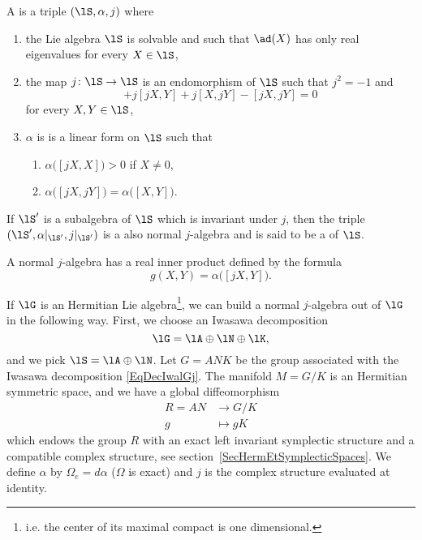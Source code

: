 \begin{definition}
    A  is a triple $(\lS,\alpha,j)$ where
    \begin{enumerate}

        \item
            the Lie algebra $\lS$ is solvable and such that $\ad(X)$ has only real eigenvalues for every $X\in\lS$,
        \item
            the map $j\colon \lS\to \lS$ is an endomorphism of $\lS$ such that $j^2=-1$ and
            \begin{equation}
                [X,Y]+j[jX,Y]+j[X,jY]-[jX,jY]=0
            \end{equation}
            for every $X,Y\in\lS$,
        \item
            $\alpha$ is is  a linear form on $\lS$ such that
            \begin{enumerate}
                \item
                    $\alpha\big( [jX,X] \big)>0$ if $X\neq 0$,
                \item
                    $\alpha\big( [jX,jY] \big)=\alpha\big( [X,Y] \big)$.
            \end{enumerate}

    \end{enumerate}
\end{definition}

If $\lS'$ is a subalgebra of $\lS$ which is invariant under $j$, then the triple $(\lS',\alpha|_{\lS'},j|_{\lS'})$ is a also normal $j$-algebra and is said to be a  of $\lS$.

A normal $j$-algebra has a real inner product defined by the formula
\begin{equation}
    g(X,Y)=\alpha\big( [jX,Y] \big).
\end{equation}

If $\lG$ is an Hermitian Lie algebra\footnote{i.e. the center of its maximal compact is one dimensional.}, we can build a normal $j$-algebra out of $\lG$ in the following way. First, we choose an Iwasawa decomposition
\begin{equation}            \label{EqDecIwalGj}
    \lG=\lA\oplus\lN\oplus\lK,
\end{equation}
and we pick $\lS=\lA\oplus\lN$. Let $G=ANK$ be the group associated with the Iwasawa decomposition \eqref{EqDecIwalGj}. The manifold $M=G/K$ is an Hermitian symmetric space, and we have a global diffeomorphism
\begin{equation}
    \begin{aligned}
        R=AN&\to G/K \\
        g&\mapsto gK
    \end{aligned}
\end{equation}
which endows the group $R$ with an exact left invariant symplectic structure and a compatible complex structure, see section~\ref{SecHermEtSymplecticSpaces}. We define $\alpha$ by $\Omega_e=d\alpha$ ($\Omega$ is exact) and $j$ is the complex structure evaluated at identity.


